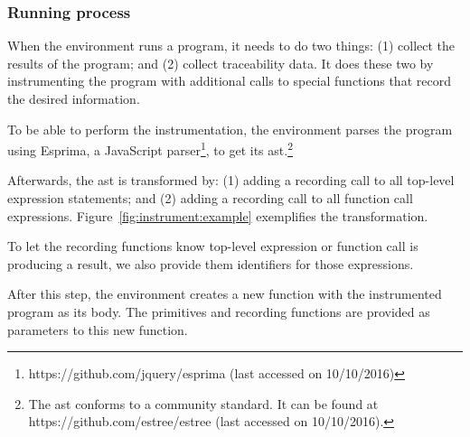 %


\subsubsection{Running process}
When the environment runs a program, it needs to do two things: (1) collect the results of the program; and (2) collect traceability data.
It does these two by instrumenting the program with additional calls to special functions that record the desired information.

To be able to perform the instrumentation, the environment parses the program using Esprima, a JavaScript parser\footnote{https://github.com/jquery/esprima (last accessed on 10/10/2016)}, to get its \gls{ast}.\footnote{The \gls{ast} conforms to a community standard. It can be found at https://github.com/estree/estree (last accessed on 10/10/2016).}

Afterwards, the \gls{ast} is transformed by: (1) adding a recording call to all top-level expression statements; and (2) adding a recording call to all function call expressions.
Figure~\ref{fig:instrument:example} exemplifies the transformation.

To let the recording functions know top-level expression or function call is producing a result, we also provide them identifiers for those expressions.

After this step, the environment creates a new function with the instrumented program as its body.
The primitives and recording functions are provided as parameters to this new function.

